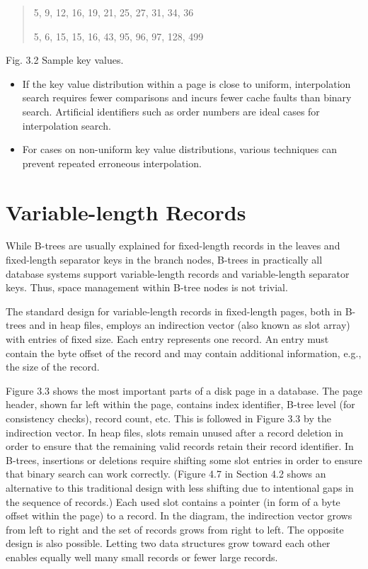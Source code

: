 \begin{quote}
5, 9, 12, 16, 19, 21, 25, 27, 31, 34, 36

5, 6, 15, 15, 16, 43, 95, 96, 97, 128, 499
\end{quote}

Fig. 3.2 Sample key values.

\begin{itemize}
\item
  If the key value distribution within a page is close to uniform,
  interpolation search requires fewer comparisons and incurs fewer cache
  faults than binary search. Artificial identifiers such as order
  numbers are ideal cases for interpolation search.
\item
  For cases on non-uniform key value distributions, various techniques
  can prevent repeated erroneous interpolation.
\end{itemize}

\hypertarget{variable-length-records}{%
\section{Variable-length Records}\label{variable-length-records}}

While B-trees are usually explained for fixed-length records in the
leaves and fixed-length separator keys in the branch nodes, B-trees in
practically all database systems support variable-length records and
variable-length separator keys. Thus, space management within B-tree
nodes is not trivial.

The standard design for variable-length records in fixed-length pages,
both in B-trees and in heap files, employs an indirection vector (also
known as slot array) with entries of fixed size. Each entry represents
one record. An entry must contain the byte offset of the record and may
contain additional information, e.g., the size of the record.

Figure 3.3 shows the most important parts of a disk page in a database.
The page header, shown far left within the page, contains index
identifier, B-tree level (for consistency checks), record count, etc.
This is followed in Figure 3.3 by the indirection vector. In heap files,
slots remain unused after a record deletion in order to ensure that the
remaining valid records retain their record identifier. In B-trees,
insertions or deletions require shifting some slot entries in order to
ensure that binary search can work correctly. (Figure 4.7 in Section 4.2
shows an alternative to this traditional design with less shifting due
to intentional gaps in the sequence of records.) Each used slot contains
a pointer (in form of a byte offset within the page) to a record. In the
diagram, the indirection vector grows from left to right and the set of
records grows from right to left. The opposite design is also possible.
Letting two data structures grow toward each other enables equally well
many small records or fewer large records.

